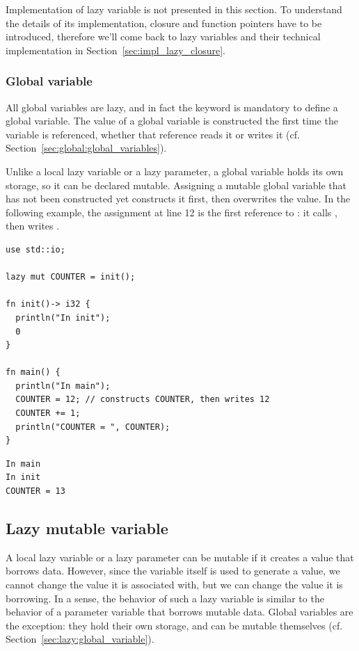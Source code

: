Implementation of lazy variable is not presented in this section. To understand
the details of its implementation, closure and function pointers have to be
introduced, therefore we'll come back to lazy variables and their technical
implementation in Section~\ref{sec:impl_lazy_closure}.

\subsubsection*{Global variable}
\label{sec:lazy:global_variable}

All global variables are lazy, and in fact the keyword  is mandatory
to define a global variable. The value of a global variable is constructed the
first time the variable is referenced, whether that reference reads it or writes
it (cf. Section~\ref{sec:global:global_variables}).

Unlike a local lazy variable or a lazy parameter, a global variable holds its own
storage, so it can be declared mutable. Assigning a mutable global variable that
has not been constructed yet constructs it first, then overwrites the value. In
the following example, the assignment at line 12 is the first reference to
: it calls , then writes .

\begin{lstlisting}[style=coloredverbatim, caption=Mutable global variable]
use std::io;

lazy mut COUNTER = init();

fn init()-> i32 {
  println("In init");
  0
}

fn main() {
  println("In main");
  COUNTER = 12; // constructs COUNTER, then writes 12
  COUNTER += 1;
  println("COUNTER = ", COUNTER);
}
\end{lstlisting}

\begin{lstlisting}[style=bashVerb]
In main
In init
COUNTER = 13
\end{lstlisting}

\subsection{Lazy mutable variable}
\label{sec:lazy:variable_lazy_mut}

A local lazy variable or a lazy parameter can be mutable if it creates a value
that borrows data. However, since the variable itself is used to generate a
value, we cannot change the value it is associated with, but we can change the
value it is borrowing. In a sense, the behavior of such a lazy variable is
similar to the behavior of a parameter variable that borrows mutable data.
Global variables are the exception: they hold their own storage, and can be
mutable themselves (cf. Section~\ref{sec:lazy:global_variable}).

